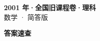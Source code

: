 \documentclass[zihao=-4, a4paper]{ctexart}
\begin{document}
\begin{center}
  {\Large\bfseries 2001 年·全国旧课程卷·理科}\\[4pt]
  {\large 数学 · 简答版}
\end{center}
\medskip
{}

\clearpage
{}
\begin{center}{\Large\bfseries 答案速查}\end{center}
\medskip

\end{document}
